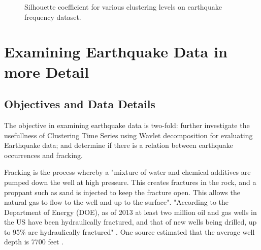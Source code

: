 \documentclass{article}
\begin{document}
\begin{figure}
\begin{center}
\caption{Silhouette coefficient for various clustering levels on earthquake frequency dataset.} \label{silhouette_score_eq}
\end{center}
\end{figure}


\section{Examining Earthquake Data in more Detail}
\subsection{Objectives and Data Details}

The objective in examining earthquake data is two-fold: further investigate  the usefullness of Clustering Time Series using Wavlet decomposition for evaluating Earthquake data; and determine if there is a relation between earthquake occurrences and fracking.


Fracking is the process whereby a "mixture of water and chemical additives are pumped down the well at high pressure. This creates fractures in the rock, and a proppant such as sand is injected to keep the fracture open. This allows the natural gas to flow to the well and up to the surface"\cite{WFUS1}. 
"According to the Department of Energy (DOE), as of 2013 at least two million oil and gas wells in the US have been hydraulically fractured, and that of new wells being drilled, up to 95\% are hydraulically fractured" \cite{WFUS1}.
One source estimated that the average well depth is 7700 feet \cite{HSW1}.
\end{document}
